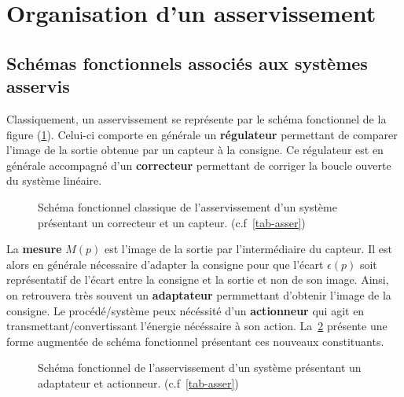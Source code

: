 \section{Organisation d'un asservissement}
\subsection{Schémas fonctionnels associés aux systèmes asservis}
Classiquement, un asservissement se représente par le schéma fonctionnel de 
la figure (\cref{fig-reg}). Celui-ci comporte en générale un \textbf{régulateur}
permettant de comparer l'image de la sortie obtenue par un capteur 
à la consigne. Ce régulateur est en générale accompagné d'un \textbf{correcteur}
permettant de corriger la boucle ouverte du système linéaire.
\begin{figure}[!h]
    \centering
    
    \caption{Schéma fonctionnel classique de l'asservissement d'un système 
             présentant un correcteur et un capteur. (c.f~\cref{tab-asser})
             \label{fig-reg}}
\end{figure}
La \textbf{mesure} $M(p)$ est l'image de la sortie par l'intermédiaire
du capteur. Il est alors en générale nécessaire d'adapter la consigne pour
que l'écart $\epsilon(p)$ soit représentatif de l'écart entre la consigne
et la sortie et non de son image. Ainsi, on retrouvera très souvent 
un \textbf{adaptateur} permmettant d'obtenir l'image de la consigne.
Le procédé/système peux nécéssité d'un \textbf{actionneur} qui agit en 
transmettant/convertissant l'énergie nécéssaire à son action. 
La~\cref{fig-reg2} présente une forme augmentée de schéma fonctionnel
présentant ces nouveaux constituants.
\begin{figure}[!h]
    \centering
    
    \caption{Schéma fonctionnel de l'asservissement d'un système 
             présentant un adaptateur et actionneur. (c.f~\cref{tab-asser})
             \label{fig-reg2}}
\end{figure}
